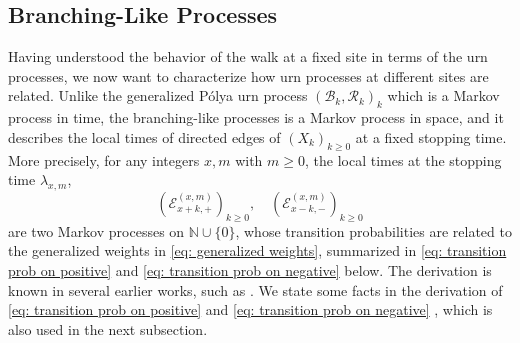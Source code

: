 \documentclass[twoside,12pt,a4paper]{article}
\numberwithin{equation}{section}
\begin{document}
	\subsection{Branching-Like Processes}
	Having understood the behavior of the walk at a fixed site in terms of the urn processes, we now want to characterize how urn processes at different sites are related. Unlike the generalized P\'{o}lya urn process $(\mathcal{B}_k,\mathcal{R}_k )_k$ which is a Markov process in time, the branching-like processes is a Markov process in space, and it describes the local times of directed edges of $(X_k)_{k\geq 0}$ at a fixed stopping time.
	More precisely, for any integers $x,m$ with $m\geq 0$, the local times at the stopping time $\lambda_{x,m}$, 
	\[
	\left(\mathcal{E}^{(x,m)}_{x+k,+} \right)_{k\geq 0}, \quad \left(\mathcal{E}^{(x,m)}_{x-k,-} \right)_{k\geq 0}
	\]
	are two Markov processes on $\mathbb{N}\cup\{0\}$, whose transition probabilities are related to the generalized weights in \eqref{eq: generalized weights}, summarized in \eqref{eq: transition prob on positive} and \eqref{eq: transition prob on negative} below. The derivation is known in several earlier works, such as \cite{T96, KP16}. We state some facts in the derivation of \eqref{eq: transition prob on positive} and \eqref{eq: transition prob on negative} , which is also used in the next subsection.
	
\end{document}
